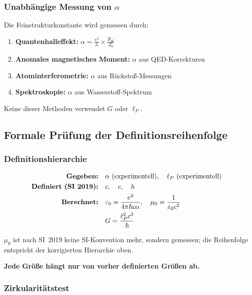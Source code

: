 	\subsubsection{Unabhängige Messung von $\alpha$}
	
	Die Feinstrukturkonstante wird gemessen durch:
	
	\begin{enumerate}
		\item \textbf{Quantenhalleffekt:} $\alpha = \frac{e^2}{h} \times \frac{R_K}{Z_0}$
		\item \textbf{Anomales magnetisches Moment:} $\alpha$ aus QED-Korrekturen
		\item \textbf{Atominterferometrie:} $\alpha$ aus Rückstoß{}-Messungen
		\item \textbf{Spektroskopie:} $\alpha$ aus Wasserstoff-Spektrum
	\end{enumerate}
	
	Keine dieser Methoden verwendet $G$ oder $\ell_P$.
	
	\subsection{Formale Prüfung der Definitionsreihenfolge}
	
	\subsubsection{Definitionshierarchie}
	
	\begin{align}
		\text{\textbf{Gegeben:}} &\quad \alpha \text{ (experimentell)}, \quad \ell_P \text{ (experimentell)}\\
		\text{\textbf{Definiert (SI 2019):}} &\quad c, \quad e, \quad h\\
		\text{\textbf{Berechnet:}} &\quad \varepsilon_0 = \frac{e^2}{4\pi\hbar c\alpha}, \quad \mu_0 = \frac{1}{\varepsilon_0 c^2}\\
		&\quad G = \frac{\ell_P^2 c^3}{\hbar}
	\end{align}
	
	$\mu_0$ ist nach SI~2019 keine SI-Konvention mehr, sondern gemessen; die Reihenfolge entspricht der korrigierten Hierarchie oben.
	
	\textbf{Jede Größ{}e hängt nur von vorher definierten Größ{}en ab.}
	
	\subsubsection{Zirkularitätstest}
	
